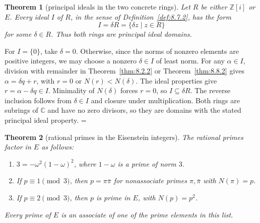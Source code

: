 \documentclass[11pt]{article}
\makeatletter
\let\nt@closedisplay\]
\def\nt@guardedclose{\@ifnextchar\par{\nt@closeafterpar}{\@ifnextchar\end{\postdisplaypenalty\@M\nt@closedisplay}{\nt@closedisplay}}}
\def\nt@closeafterpar\par{\@ifnextchar\par{\nt@closeafterpar}{\@ifnextchar\end{\postdisplaypenalty\@M\nt@closedisplay\par}{\nt@closedisplay\par}}}
\renewenvironment{proof}[1][\proofname]{\par
  \pushQED{\qed}\normalfont\topsep\medskipamount\edef\nt@afterproof{\@endparpenalty=\the\@endparpenalty\relax}\@beginparpenalty\@M\@endparpenalty\@M\let\]\nt@guardedclose\trivlist\item[]\textit{#1\@addpunct{.}} \ignorespaces}{\ifvmode\addpenalty\@M\fi\popQED\nt@afterproof\endtrivlist\@endpefalse}
\theoremstyle{ntstyle}
\newtheorem{theorem}{Theorem}[subsection]
\makeatother
\begin{document}
\begin{theorem}[principal ideals in the two concrete rings]\label{thm:8.8.3}\label{thm:principal-ideals-in-the-two-concrete-rings}
  Let $R$ be either $\mathbb{Z}[i]$ or $E$. Every ideal $I$ of $R$, in the
  sense of Definition~\ref{def:8.7.2}, has the form
  \[
    I=\delta R=\{\delta z\mid z\in R\}
  \]
  for some $\delta\in R$. Thus both rings are principal ideal domains.

\end{theorem}

\begin{proof}
  For $I=\{0\}$, take $\delta=0$. Otherwise, since the norms of nonzero elements are positive integers, we may
  choose a nonzero
  $\delta\in I$ of least norm.
  For any $\alpha\in I$, division with remainder in
  Theorem~\ref{thm:8.2.2} or Theorem~\ref{thm:8.8.2} gives
  $\alpha=\delta q+r$, with $r=0$ or $N(r)<N(\delta)$.
  The ideal properties give $r=\alpha-\delta q\in I$.
  Minimality of $N(\delta)$ forces $r=0$, so $I\subseteq\delta R$.
  The reverse inclusion follows from $\delta\in I$ and closure under
  multiplication. Both rings are subrings of $\mathbb{C}$ and have no zero
  divisors, so they are domains with the stated principal ideal property.
\end{proof}

\begin{theorem}[rational primes in the Eisenstein integers]\label{thm:8.8.4}\label{thm:rational-primes-in-the-eisenstein-integers}
  The rational primes factor in $E$ as follows:
  \begin{enumerate}[label={\alph*)}]
    \item $3=-\omega^2(1-\omega)^2$, where $1-\omega$ is a prime of norm $3$.
    \item If $p\equiv1\pmod{3}$, then $p=\pi\bar\pi$ for nonassociate primes
          $\pi,\bar\pi$ with $N(\pi)=p$.
    \item If $p\equiv2\pmod{3}$, then $p$ is prime in $E$, with $N(p)=p^2$.
  \end{enumerate}
  Every prime of $E$ is an associate of one of the prime elements in this list.

\end{theorem}
\end{document}
